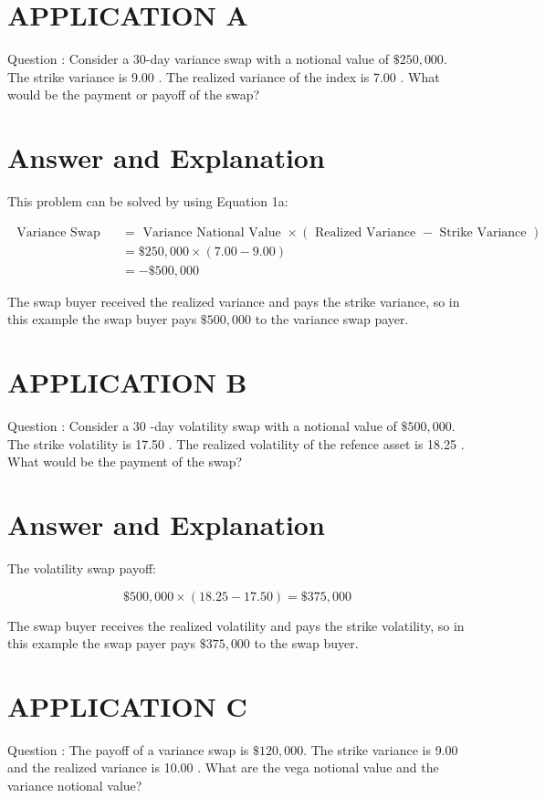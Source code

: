 \documentclass[11pt]{article}
\begin{document}
\section*{APPLICATION A}
Question : Consider a 30-day variance swap with a notional value of $\$ 250,000$. The strike variance is 9.00 . The realized variance of the index is 7.00 . What would be the payment or payoff of the swap?

\section*{Answer and Explanation}
This problem can be solved by using Equation 1a:

$$
\begin{aligned}
\text { Variance Swap Payoff } & =\text { Variance National Value } \times(\text { Realized Variance }- \text { Strike Variance }) \\
& =\$ 250,000 \times(7.00-9.00) \\
& =-\$ 500,000
\end{aligned}
$$

The swap buyer received the realized variance and pays the strike variance, so in this example the swap buyer pays $\$ 500,000$ to the variance swap payer.

\section*{APPLICATION B}
Question : Consider a 30 -day volatility swap with a notional value of $\$ 500,000$. The strike volatility is 17.50 . The realized volatility of the refence asset is 18.25 . What would be the payment of the swap?

\section*{Answer and Explanation}
The volatility swap payoff:

$$
\$ 500,000 \times(18.25-17.50)=\$ 375,000
$$

The swap buyer receives the realized volatility and pays the strike volatility, so in this example the swap payer pays $\$ 375,000$ to the swap buyer.

\section*{APPLICATION C}
Question : The payoff of a variance swap is $\$ 120,000$. The strike variance is 9.00 and the realized variance is 10.00 . What are the vega notional value and the variance notional value?
\end{document}
